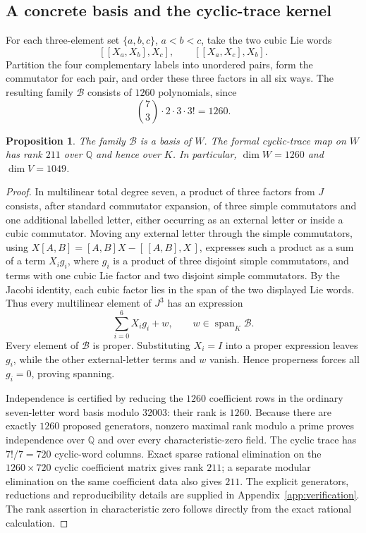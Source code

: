 \documentclass[11pt,reqno]{amsart}
\newtheorem{proposition}[theorem]{Proposition}
\theoremstyle{definition}
\newcommand{\Span}{\operatorname{span}}
\begin{document}
\subsection{A concrete basis and the cyclic-trace kernel}
For each three-element set $\{a,b,c\}$, $a<b<c$, take the two cubic Lie words
\[
 [[X_a,X_b],X_c],\qquad [[X_a,X_c],X_b].
\]
Partition the four complementary labels into unordered pairs, form the commutator for each pair, and order these three factors in all six ways.  The resulting family $\mathscr B$ consists of $1260$ polynomials, since
\begin{equation}\label{eq:1260}
 \binom73\cdot2\cdot3\cdot3!=1260.
\end{equation}

\begin{proposition}\label{prop:basis}
The family $\mathscr B$ is a basis of $W$.  The formal cyclic-trace map on $W$ has rank $211$ over $\mathbb Q$ and hence over $K$.  In particular, $\dim W=1260$ and $\dim V=1049$.
\end{proposition}
\begin{proof}
In multilinear total degree seven, a product of three factors from $J$ consists, after standard commutator expansion, of three simple commutators and one additional labelled letter, either occurring as an external letter or inside a cubic commutator.  Moving any external letter through the simple commutators, using $X[A,B]=[A,B]X-[\,[A,B],X\,]$, expresses such a product as a sum of a term $X_i g_i$, where $g_i$ is a product of three disjoint simple commutators, and terms with one cubic Lie factor and two disjoint simple commutators.  By the Jacobi identity, each cubic factor lies in the span of the two displayed Lie words.  Thus every multilinear element of $J^3$ has an expression
\[
 \sum_{i=0}^6 X_i g_i+w,\qquad w\in\Span_K\mathscr B.
\]
Every element of $\mathscr B$ is proper.  Substituting $X_i=I$ into a proper expression leaves $g_i$, while the other external-letter terms and $w$ vanish.  Hence properness forces all $g_i=0$, proving spanning.

Independence is certified by reducing the $1260$ coefficient rows in the ordinary seven-letter word basis modulo $32003$: their rank is $1260$.  Because there are exactly $1260$ proposed generators, nonzero maximal rank modulo a prime proves independence over $\mathbb Q$ and over every characteristic-zero field.  The cyclic trace has $7!/7=720$ cyclic-word columns.  Exact sparse rational elimination on the $1260\times720$ cyclic coefficient matrix gives rank $211$; a separate modular elimination on the same coefficient data also gives $211$.  The explicit generators, reductions and reproducibility details are supplied in Appendix~\ref{app:verification}.  The rank assertion in characteristic zero follows directly from the exact rational calculation.
\end{proof}
\end{document}

